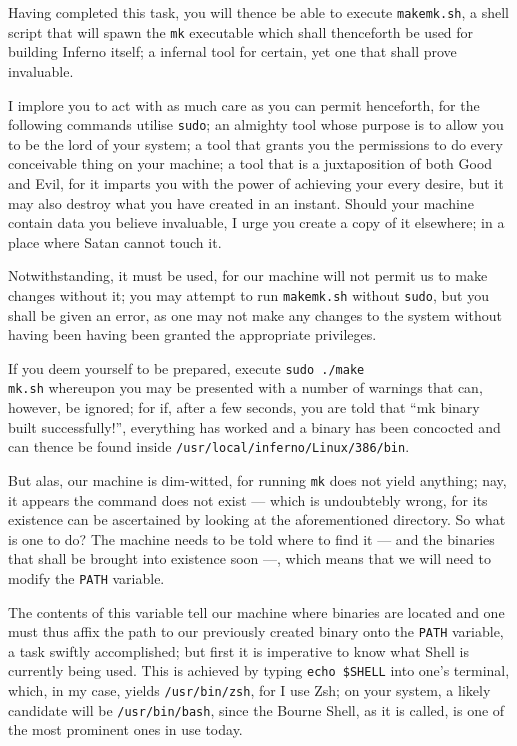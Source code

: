 \documentclass[a5paper,twoside,12pt]{report}
\begin{document}
  Having completed this task, you will thence be able to execute \texttt{makemk.sh}, a shell script that will spawn the \texttt{mk} executable which shall thenceforth be used for building Inferno itself; a infernal tool for certain, yet one that shall prove invaluable.

  I implore you to act with as much care as you can permit henceforth, for the following commands utilise \texttt{sudo}; an almighty tool whose purpose is to allow you to be the lord of your system; a tool that grants you the permissions to do every conceivable thing on your machine; a tool that is a juxtaposition of both Good and Evil, for it imparts you with the power of achieving your every desire, but it may also destroy what you have created in an instant. Should your machine contain data you believe invaluable, I urge you create a copy of it elsewhere; in a place where Satan cannot touch it.

  Notwithstanding, it must be used, for our machine will not permit us to make changes without it; you may attempt to run \texttt{makemk.sh} without \texttt{sudo}, but you shall be given an error, as one may not make any changes to the system without having been having been granted the appropriate privileges.

  If you deem yourself to be prepared, execute \texttt{sudo ./make\\mk.sh} whereupon you may be presented with a number of warnings that can, however, be ignored; for if, after a few seconds, you are told that ``mk binary built successfully!'', everything has worked and a binary has been concocted and can thence be found inside \texttt{/usr/local/inferno/Linux/386/bin}.

  But alas, our machine is dim-witted, for running \texttt{mk} does not yield anything; nay, it appears the command does not exist — which is undoubtebly wrong, for its existence can be ascertained by looking at the aforementioned directory. So what is one to do? The machine needs to be told where to find it — and the binaries that shall be brought into existence soon —, which means that we will need to modify the \texttt{PATH} variable.

  The contents of this variable tell our machine where binaries are located and one must thus affix the path to our previously created binary onto the \texttt{PATH} variable, a task swiftly accomplished; but first it is imperative to know what Shell is currently being used. This is achieved by typing \texttt{echo \$SHELL} into one's terminal, which, in my case, yields \texttt{/usr/bin/zsh}, for I use Zsh; on your system, a likely candidate will be \texttt{/usr/bin/bash}, since the Bourne Shell, as it is called, is one of the most prominent ones in use today.
\end{document}
